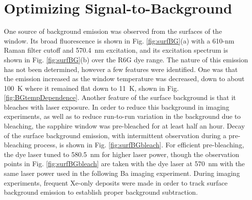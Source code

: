 



\section{Optimizing Signal-to-Background}
\label{sec:bgs}

One source of background emission was observed from the surfaces of the window.  Its broad fluorescence is shown in Fig. \ref{fig:surfBG}(a) with a 610-nm Raman filter cutoff and 570.4~nm excitation, and its excitation spectrum is shown in Fig. \ref{fig:surfBG}(b) over the R6G dye range.  The nature of this emission has not been determined, however a few features were identified.  One was that the emission increased as the window temperature was decreased, down to about 100~K where it remained flat down to 11~K, shown in Fig. \ref{fig:BGtempDependence}.  Another feature of the surface background is that it bleaches with laser exposure.  In order to reduce this background in imaging experiments, as well as to reduce run-to-run variation in the background due to bleaching, the sapphire window was pre-bleached for at least half an hour.  Decay of the surface background emission, with intermittent observation during a pre-bleaching process, is shown in Fig. \ref{fig:surfBGbleach}.  For efficient pre-bleaching, the dye laser tuned to 580.5~nm for higher laser power, though the observation points in Fig. \ref{fig:surfBGbleach} are taken with the dye laser at 570~nm with the same laser power used in the following Ba imaging experiment.  During imaging experiments, frequent Xe-only deposits were made in order to track surface background emission to establish proper background subtraction.

